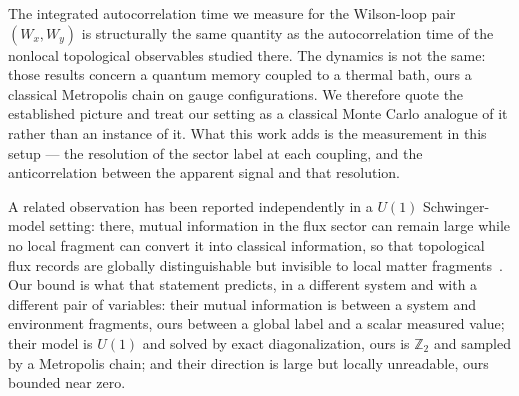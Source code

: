 \documentclass[aps,pra,twocolumn,superscriptaddress,showpacs,floatfix]{revtex4-2}
\newcommand{\Ztwo}{\mathbb{Z}_2}
\begin{document}
The integrated autocorrelation time we measure for the Wilson-loop pair
$(W_x, W_y)$ is structurally the same quantity as the autocorrelation time of
the nonlocal topological observables studied there. The dynamics is not the
same: those results concern a quantum memory coupled to a thermal bath, ours a
classical Metropolis chain on gauge configurations. We therefore quote the
established picture and treat our setting as a classical Monte Carlo analogue
of it rather than an instance of it. What this work adds is the measurement in
this setup --- the resolution of the sector label at each coupling, and the
anticorrelation between the apparent signal and that resolution.

A related observation has been reported independently in a $U(1)$
Schwinger-model setting: there, mutual information in the flux sector can
remain large while no local fragment can convert it into classical information,
so that topological flux records are globally distinguishable but invisible to
local matter fragments~\cite{Boudjerada2026}. Our bound is what that statement
predicts, in a different system and with a different pair of variables: their
mutual information is between a system and environment fragments, ours between
a global label and a scalar measured value; their model is $U(1)$ and solved by
exact diagonalization, ours is $\Ztwo$ and sampled by a Metropolis chain; and
their direction is large but locally unreadable, ours bounded near zero.
\end{document}
